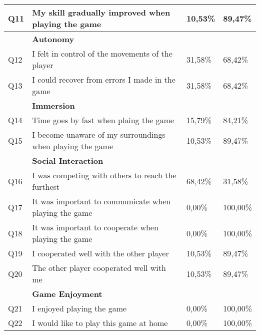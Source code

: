 \begin{table}[]
\begin{tabularx}{\textwidth}{|l|X|l|l|}
		Q11         & My skill gradually improved when playing the game              & 10,53\%           & 89,47\%        \\ \hline
		& \textbf{Autonomy}                                              &                   &                \\ \hline
		Q12         & I felt in control of the movements of the player               & 31,58\%           & 68,42\%        \\ \hline
		Q13         & I could recover from errors I made in the game                 & 31,58\%           & 68,42\%        \\ \hline
		& \textbf{Immersion}                                             &                   &                \\ \hline
		Q14         & Time goes by fast when plaing the game                         & 15,79\%           & 84,21\%        \\ \hline
		Q15         & I become unaware of my surroundings when playing the game      & 10,53\%           & 89,47\%        \\ \hline
		& \textbf{Social Interaction}                                    &                   &                \\ \hline
		Q16         & I was competing with others to reach the furthest              & 68,42\%           & 31,58\%        \\ \hline
		Q17         & It was important to communicate when playing the game          & 0,00\%            & 100,00\%       \\ \hline
		Q18         & It was important to cooperate when playing the game            & 0,00\%            & 100,00\%       \\ \hline
		Q19         & I cooperated well with the other player                        & 10,53\%           & 89,47\%        \\ \hline
		Q20         & The other player cooperated well with me                       & 10,53\%           & 89,47\%        \\ \hline
		& \textbf{Game Enjoyment}                                        &                   &                \\ \hline
		Q21         & I enjoyed playing the game                                     & 0,00\%            & 100,00\%       \\ \hline
		Q22         & I would like to play this game at home                         & 0,00\%            & 100,00\%       \\ \hline
	\end{tabularx}
\end{table}


